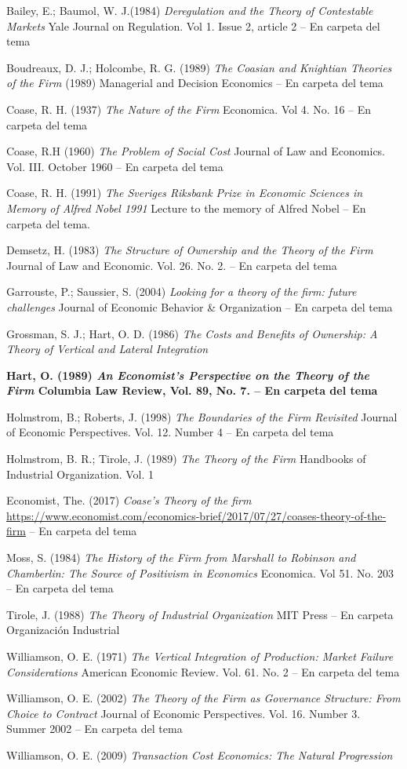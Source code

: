 \documentclass{nuevotema}
\begin{document}
Bailey, E.; Baumol, W. J.(1984) \textit{Deregulation and the Theory of Contestable Markets} Yale Journal on Regulation. Vol 1. Issue 2, article 2 -- En carpeta del tema

Boudreaux, D. J.; Holcombe, R. G. (1989) \textit{The Coasian and Knightian Theories of the Firm} (1989) Managerial and Decision Economics -- En carpeta del tema

Coase, R. H. (1937) \textit{The Nature of the Firm} Economica. Vol 4. No. 16 -- En carpeta del tema

Coase, R.H (1960) \textit{The Problem of Social Cost} Journal of Law and Economics. Vol. III. October 1960 -- En carpeta del tema

Coase, R. H. (1991) \textit{The Sveriges Riksbank Prize in Economic Sciences in Memory of Alfred Nobel 1991} Lecture to the memory of Alfred Nobel -- En carpeta del tema.

Demsetz, H. (1983) \textit{The Structure of Ownership and the Theory of the Firm} Journal of Law and Economic. Vol. 26. No. 2. -- En carpeta del tema

Garrouste, P.; Saussier, S. (2004) \textit{Looking for a theory of the firm: future challenges} Journal of Economic Behavior \& Organization -- En carpeta del tema

Grossman, S. J.; Hart, O. D. (1986) \textit{The Costs and Benefits of Ownership: A Theory of Vertical and Lateral Integration}

\textbf{Hart, O. (1989) \textit{An Economist's Perspective on the Theory of the Firm} Columbia Law Review, Vol. 89, No. 7. -- En carpeta del tema}

Holmstrom, B.; Roberts, J. (1998) \textit{The Boundaries of the Firm Revisited} Journal of Economic Perspectives. Vol. 12. Number 4 -- En carpeta del tema

Holmstrom, B. R.; Tirole, J. (1989) \textit{The Theory of the Firm} Handbooks of Industrial Organization. Vol. 1

Economist, The. (2017) \textit{Coase's Theory of the firm} \url{https://www.economist.com/economics-brief/2017/07/27/coases-theory-of-the-firm} -- En carpeta del tema

Moss, S. (1984) \textit{The History of the Firm from Marshall to Robinson and Chamberlin: The Source of Positivism in Economics} Economica. Vol 51. No. 203 -- En carpeta del tema

Tirole, J. (1988) \textit{The Theory of Industrial Organization} MIT Press -- En carpeta Organización Industrial

Williamson, O. E. (1971) \textit{The Vertical Integration of Production: Market Failure Considerations} American Economic Review. Vol. 61. No. 2 -- En carpeta del tema

Williamson, O. E. (2002) \textit{The Theory of the Firm as Governance Structure: From Choice to Contract} Journal of Economic Perspectives. Vol. 16. Number 3. Summer 2002 -- En carpeta del tema

Williamson, O. E. (2009) \textit{Transaction Cost Economics: The Natural Progression}
\end{document}
